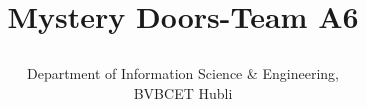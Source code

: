 \documentclass[11pt,a4,oneeside]{report}
\begin{document}
    \title{
    \textbf{\huge{Mystery Doors-Team A6}}
\author{Department of Information Science \& Engineering, \\ BVBCET Hubli}
}















\end{document}
